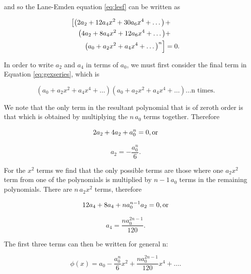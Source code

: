 \documentclass[12pt, manuscript]{article}
\begin{document}
and so the Lane-Emden equation \eqref{eq:lesf} can be written as

\begin{align}\label{eq:gexseries}
\left[\left( 2a_2 + 12a_4x^2 + 30a_6x^4 + \dots \right)\right. &+ \notag \\
\left( 4a_2 + 8a_4x^2 + 12a_6x^4 + \dots \right) &+ \\
\left.\left( a_0 + a_2x^2 + a_4x^4 + \dots \right)^n\right] &= 0. \notag
\end{align}

In order to write $a_2$ and $a_4$ in terms of $a_0$, we must first consider the final term in Equation \eqref{eq:gexseries}, which is

\begin{equation}
\left( a_0 + a_2x^2 + a_4x^4 + \dots \right) \left( a_0 + a_2x^2 + a_4x^4 + \dots \right) \dots \text{n times}.
\end{equation}

We note that the only term in the resultant polynomial that is of zeroth order is that which is obtained by multiplying the $n\,a_0$ terms together. Therefore

\begin{equation}
2a_2 + 4a_2 + a_0^n = 0, \text{or} \notag
\end{equation}

\begin{equation}
a_2 = -\frac{a_0^n}{6}.
\end{equation}

For the $x^2$ terms we find that the only possible terms are those where one $a_2x^2$ term from one of the polynomials is multiplied by $n-1\,a_0$ terms in the remaining polynomials. There are $n\,a_2x^2$ terms, therefore

\begin{equation}
12a_4 + 8a_4 + na_0^{n-1}a_2 = 0, \text{or} \notag
\end{equation}

\begin{equation}
a_4 = \frac{na_0^{2n-1}}{120}.
\end{equation}

The first three terms can then be written for general n:

\begin{equation}
\phi \left( x \right) = a_0 - \frac{a_0^n}{6}x^2 + \frac{na_0^{2n-1}}{120}x^4 + \dots.
\end{equation}
\end{document}
